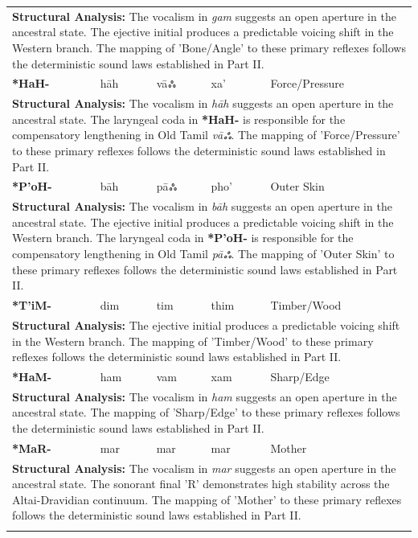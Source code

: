 \begin{longtable}{p{} p{} p{} p{} p{}}
\multicolumn{5}{p{\textwidth}}{\small \textbf{Structural Analysis:} The vocalism in \textit{gam} suggests an open aperture in the ancestral state. The ejective initial produces a predictable voicing shift in the Western branch. The mapping of 'Bone/Angle' to these primary reflexes follows the deterministic sound laws established in Part II.} \\ \addlinespace[15pt] 
\textbf{*HaH-} & hāh & vāஃ & xa' & Force/Pressure \\ 
\multicolumn{5}{p{\textwidth}}{\small \textbf{Structural Analysis:} The vocalism in \textit{hāh} suggests an open aperture in the ancestral state. The laryngeal coda in \textbf{*HaH-} is responsible for the compensatory lengthening in Old Tamil \textit{vāஃ}. The mapping of 'Force/Pressure' to these primary reflexes follows the deterministic sound laws established in Part II.} \\ \addlinespace[15pt] 
\textbf{*P'oH-} & bāh & pāஃ & pho' & Outer Skin \\ 
\multicolumn{5}{p{\textwidth}}{\small \textbf{Structural Analysis:} The vocalism in \textit{bāh} suggests an open aperture in the ancestral state. The ejective initial produces a predictable voicing shift in the Western branch. The laryngeal coda in \textbf{*P'oH-} is responsible for the compensatory lengthening in Old Tamil \textit{pāஃ}. The mapping of 'Outer Skin' to these primary reflexes follows the deterministic sound laws established in Part II.} \\ \addlinespace[15pt] 
\textbf{*T'iM-} & dim & tim & thim & Timber/Wood \\ 
\multicolumn{5}{p{\textwidth}}{\small \textbf{Structural Analysis:} The ejective initial produces a predictable voicing shift in the Western branch. The mapping of 'Timber/Wood' to these primary reflexes follows the deterministic sound laws established in Part II.} \\ \addlinespace[15pt] 
\textbf{*HaM-} & ham & vam & xam & Sharp/Edge \\ 
\multicolumn{5}{p{\textwidth}}{\small \textbf{Structural Analysis:} The vocalism in \textit{ham} suggests an open aperture in the ancestral state. The mapping of 'Sharp/Edge' to these primary reflexes follows the deterministic sound laws established in Part II.} \\ \addlinespace[15pt] 
\textbf{*MaR-} & mar & mar & mar & Mother \\ 
\multicolumn{5}{p{\textwidth}}{\small \textbf{Structural Analysis:} The vocalism in \textit{mar} suggests an open aperture in the ancestral state. The sonorant final 'R' demonstrates high stability across the Altai-Dravidian continuum. The mapping of 'Mother' to these primary reflexes follows the deterministic sound laws established in Part II.} \\ \addlinespace[15pt] 

\end{longtable}
